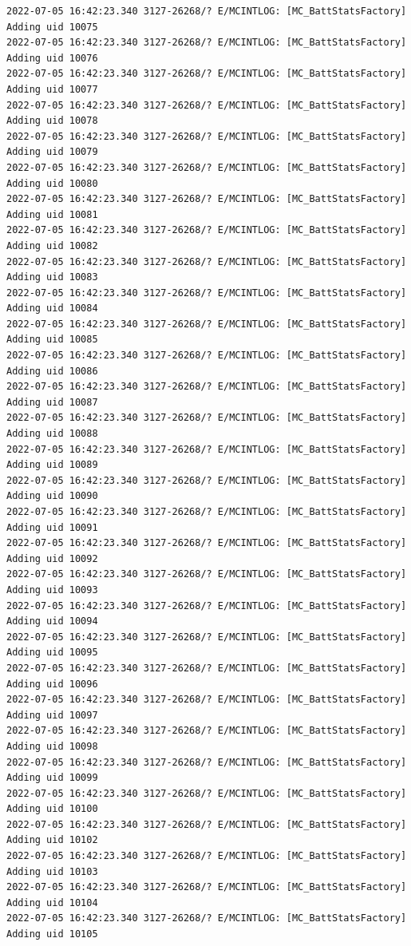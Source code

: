 \documentclass[a4paper,12pt]{book}
\begin{document}
\begin{lstlisting}
2022-07-05 16:42:23.340 3127-26268/? E/MCINTLOG: [MC_BattStatsFactory] Adding uid 10075
2022-07-05 16:42:23.340 3127-26268/? E/MCINTLOG: [MC_BattStatsFactory] Adding uid 10076
2022-07-05 16:42:23.340 3127-26268/? E/MCINTLOG: [MC_BattStatsFactory] Adding uid 10077
2022-07-05 16:42:23.340 3127-26268/? E/MCINTLOG: [MC_BattStatsFactory] Adding uid 10078
2022-07-05 16:42:23.340 3127-26268/? E/MCINTLOG: [MC_BattStatsFactory] Adding uid 10079
2022-07-05 16:42:23.340 3127-26268/? E/MCINTLOG: [MC_BattStatsFactory] Adding uid 10080
2022-07-05 16:42:23.340 3127-26268/? E/MCINTLOG: [MC_BattStatsFactory] Adding uid 10081
2022-07-05 16:42:23.340 3127-26268/? E/MCINTLOG: [MC_BattStatsFactory] Adding uid 10082
2022-07-05 16:42:23.340 3127-26268/? E/MCINTLOG: [MC_BattStatsFactory] Adding uid 10083
2022-07-05 16:42:23.340 3127-26268/? E/MCINTLOG: [MC_BattStatsFactory] Adding uid 10084
2022-07-05 16:42:23.340 3127-26268/? E/MCINTLOG: [MC_BattStatsFactory] Adding uid 10085
2022-07-05 16:42:23.340 3127-26268/? E/MCINTLOG: [MC_BattStatsFactory] Adding uid 10086
2022-07-05 16:42:23.340 3127-26268/? E/MCINTLOG: [MC_BattStatsFactory] Adding uid 10087
2022-07-05 16:42:23.340 3127-26268/? E/MCINTLOG: [MC_BattStatsFactory] Adding uid 10088
2022-07-05 16:42:23.340 3127-26268/? E/MCINTLOG: [MC_BattStatsFactory] Adding uid 10089
2022-07-05 16:42:23.340 3127-26268/? E/MCINTLOG: [MC_BattStatsFactory] Adding uid 10090
2022-07-05 16:42:23.340 3127-26268/? E/MCINTLOG: [MC_BattStatsFactory] Adding uid 10091
2022-07-05 16:42:23.340 3127-26268/? E/MCINTLOG: [MC_BattStatsFactory] Adding uid 10092
2022-07-05 16:42:23.340 3127-26268/? E/MCINTLOG: [MC_BattStatsFactory] Adding uid 10093
2022-07-05 16:42:23.340 3127-26268/? E/MCINTLOG: [MC_BattStatsFactory] Adding uid 10094
2022-07-05 16:42:23.340 3127-26268/? E/MCINTLOG: [MC_BattStatsFactory] Adding uid 10095
2022-07-05 16:42:23.340 3127-26268/? E/MCINTLOG: [MC_BattStatsFactory] Adding uid 10096
2022-07-05 16:42:23.340 3127-26268/? E/MCINTLOG: [MC_BattStatsFactory] Adding uid 10097
2022-07-05 16:42:23.340 3127-26268/? E/MCINTLOG: [MC_BattStatsFactory] Adding uid 10098
2022-07-05 16:42:23.340 3127-26268/? E/MCINTLOG: [MC_BattStatsFactory] Adding uid 10099
2022-07-05 16:42:23.340 3127-26268/? E/MCINTLOG: [MC_BattStatsFactory] Adding uid 10100
2022-07-05 16:42:23.340 3127-26268/? E/MCINTLOG: [MC_BattStatsFactory] Adding uid 10102
2022-07-05 16:42:23.340 3127-26268/? E/MCINTLOG: [MC_BattStatsFactory] Adding uid 10103
2022-07-05 16:42:23.340 3127-26268/? E/MCINTLOG: [MC_BattStatsFactory] Adding uid 10104
2022-07-05 16:42:23.340 3127-26268/? E/MCINTLOG: [MC_BattStatsFactory] Adding uid 10105

\end{lstlisting}
\end{document}
